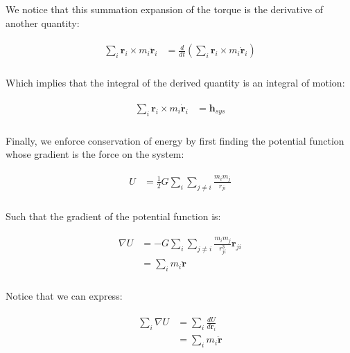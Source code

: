 \documentclass[
]{article}
\begin{document}
We notice that this summation expansion of the torque is the derivative
of another quantity:

\[\begin{aligned}
\begin{aligned}
    \sum_i \mathbf{r}_i \times m_i \ddot{\mathbf{r}}_i &= \frac{d}{dt} \left( \sum_i \mathbf{r}_i \times m_i \dot{\mathbf{r}}_i \right) \\
\end{aligned}
\end{aligned}\]

Which implies that the integral of the derived quantity is an integral
of motion:

\[\begin{aligned}
\begin{aligned}
    \sum_i \mathbf{r}_i \times m_i \dot{\mathbf{r}}_i &= \mathbf{h}_{sys} \\
\end{aligned}
\end{aligned}\]

Finally, we enforce conservation of energy by first finding the
potential function whose gradient is the force on the system:

\[\begin{aligned}
\begin{aligned}
    U &= \frac{1}{2} G \sum_i \sum_{j \neq i} \frac{m_i m_j}{r_{ji}} \\
\end{aligned}
\end{aligned}\]

Such that the gradient of the potential function is:

\[\begin{aligned}
\begin{aligned}
    \nabla U &= -G \sum_i \sum_{j \neq i} \frac{m_i m_j}{r_{ji}^3} \mathbf{r}_{ji} \\
    &= \sum_i m_i \ddot{\mathbf{r}} \\
\end{aligned}
\end{aligned}\]

Notice that we can express:

\[\begin{aligned}
\begin{aligned}
    \sum_i \nabla U &= \sum_i\frac{d U}{d \mathbf{r}_i} \\
    &= \sum_i m_i \ddot{\mathbf{r}}
\end{aligned}
\end{aligned}\]
\end{document}
